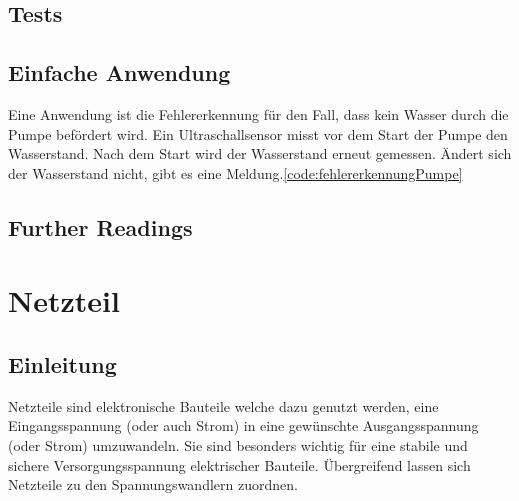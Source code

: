 \subsection{Tests}
\subsection{Einfache Anwendung}
Eine Anwendung ist die Fehlererkennung für den Fall, dass kein Wasser durch die Pumpe befördert wird. 
Ein Ultraschallsensor misst vor dem Start der Pumpe den Wasserstand. Nach dem Start wird der Wasserstand erneut gemessen. Ändert sich der Wasserstand nicht, gibt es eine Meldung.\ref{code:fehlererkennungPumpe}

\begin{code}[H]
	\caption{Einfacher Code zur Fehlererkennung}
	\label{code:fehlererkennungPumpe}
\end{code}


\subsection{Further Readings}

\section{Netzteil}
\subsection{Einleitung}
Netzteile sind elektronische Bauteile welche dazu genutzt werden, eine Eingangsspannung (oder auch Strom) in eine gewünschte Ausgangsspannung (oder Strom) umzuwandeln. Sie sind besonders wichtig für eine stabile und sichere Versorgungsspannung elektrischer Bauteile. Übergreifend lassen sich Netzteile zu den Spannungswandlern zuordnen. \cite{Hering:2024}

